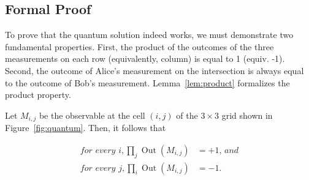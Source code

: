 \documentclass{llncs}
\begin{document}
\subsection{Formal Proof}
To prove that the quantum solution indeed works, we must demonstrate
two fundamental properties. First, the product of the outcomes of the
three measurements on each row (equivalently, column) is equal to 1
(equiv. -1). Second, the outcome of Alice's measurement on the
intersection is always equal to the outcome of Bob's
measurement. Lemma~\ref{lem:product} formalizes the product property.

\begin{lemma}
  \label{lem:product}
  Let \(M_{i, j}\) be the observable at the cell \((i, j)\) of the
  \(3 \times 3\) grid shown in Figure~\ref{fig:quantum}. Then,
  it follows that

  \begin{align}
    \textit{for every }i, \prod_{j} \operatorname{Out}(M_{i, j}) &= +1  \textit{, and} \\
    \textit{for every }j, \prod_{i} \operatorname{Out}(M_{i, j}) &= -1.
  \end{align}
\end{lemma}
\end{document}
